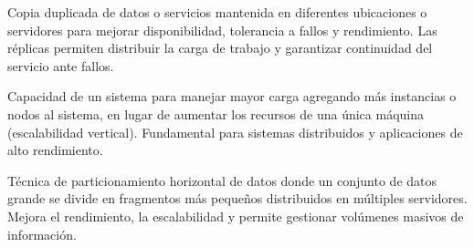 \begin{description}[style=nextline,leftmargin=0pt]
    \item[Réplica]
    Copia duplicada de datos o servicios mantenida en diferentes ubicaciones o servidores para mejorar disponibilidad, tolerancia a fallos y rendimiento. Las réplicas permiten distribuir la carga de trabajo y garantizar continuidad del servicio ante fallos.
    
    \item[Escalabilidad Horizontal]
    Capacidad de un sistema para manejar mayor carga agregando más instancias o nodos al sistema, en lugar de aumentar los recursos de una única máquina (escalabilidad vertical). Fundamental para sistemas distribuidos y aplicaciones de alto rendimiento.
    
    \item[Dispersión de Datos (\textit{Data Sharding})]
    Técnica de particionamiento horizontal de datos donde un conjunto de datos grande se divide en fragmentos más pequeños distribuidos en múltiples servidores. Mejora el rendimiento, la escalabilidad y permite gestionar volúmenes masivos de información.
\end{description}

